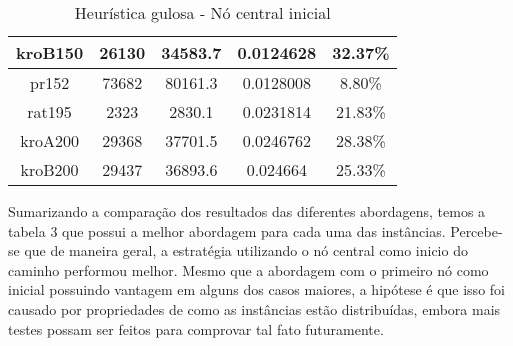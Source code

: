 \documentclass[10pt]{extarticle} %
\begin{document}
\begin{table}[h]
\begin{tabular}{|c|c|c|c|c|}
        kroB150           & 26130          & 34583.7        & 0.0124628        & 32.37\%        \\ \hline
        pr152             & 73682          & 80161.3        & 0.0128008        & 8.80\%         \\ \hline
        rat195            & 2323           & 2830.1         & 0.0231814        & 21.83\%        \\ \hline
        kroA200           & 29368          & 37701.5        & 0.0246762        & 28.38\%        \\ \hline
        kroB200           & 29437          & 36893.6        & 0.024664         & 25.33\%        \\ \hline
    \end{tabular}
    \caption{Heurística gulosa - Nó central inicial}
    \label{tab:my_label}
\end{table}

Sumarizando a comparação dos resultados das diferentes abordagens, temos a tabela 3 que possui a melhor abordagem para cada uma das instâncias. Percebe-se que de maneira geral, a estratégia utilizando o nó central como inicio do caminho performou melhor. Mesmo que a abordagem com o primeiro nó como inicial possuindo vantagem em alguns dos casos maiores, a hipótese é que isso foi causado por propriedades de como as instâncias estão distribuídas, embora mais testes possam ser feitos para comprovar tal fato futuramente.
\end{document}
